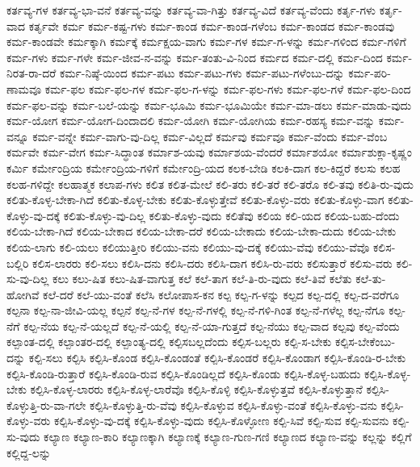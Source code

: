 {ಕರ್ತವ್ಯ-ಗಳ
ಕರ್ತವ್ಯ-ಭಾ-ವನೆ
ಕರ್ತವ್ಯ-ವನ್ನು
ಕರ್ತವ್ಯ-ವಾ-ಗಿತ್ತು
ಕರ್ತವ್ಯ-ವಿದೆ
ಕರ್ತವ್ಯ-ವೆಂದು
ಕರ್ತೃ-ಗಳು
ಕರ್ತೃ-ವಾದ
ಕರ್ತೃವೇ
ಕರ್ಮ
ಕರ್ಮ-ಕಷ್ಟ-ಗಳು
ಕರ್ಮ-ಕಾಂಡ
ಕರ್ಮ-ಕಾಂಡ-ಗಳೆಂಬ
ಕರ್ಮ-ಕಾಂಡದ
ಕರ್ಮ-ಕಾಂಡವು
ಕರ್ಮ-ಕಾಂಡವೇ
ಕರ್ಮಕ್ಕಾಗಿ
ಕರ್ಮಕ್ಕೆ
ಕರ್ಮಕ್ಷಯ-ವಾಗು
ಕರ್ಮ-ಗಳ
ಕರ್ಮ-ಗ-ಳನ್ನು
ಕರ್ಮ-ಗಳಿಂದ
ಕರ್ಮ-ಗಳಿಗೆ
ಕರ್ಮ-ಗಳು
ಕರ್ಮ-ಗಳೇ
ಕರ್ಮ-ಜೀವ-ನ-ವನ್ನು
ಕರ್ಮ-ತಂತು-ವಿ-ನಿಂದ
ಕರ್ಮದ
ಕರ್ಮ-ದಲ್ಲಿ
ಕರ್ಮ-ದಿಂದ
ಕರ್ಮ-ನಿರತ-ರಾ-ದರೆ
ಕರ್ಮ-ನಿಷ್ಠೆ-ಯಿಂದ
ಕರ್ಮ-ಪಟು
ಕರ್ಮ-ಪಟು-ಗಳು
ಕರ್ಮ-ಪಟು-ಗಳೆಂಬು-ದನ್ನು
ಕರ್ಮ-ಪರಿ-ಣಾಮವೂ
ಕರ್ಮ-ಫಲ
ಕರ್ಮ-ಫಲ-ಗಳ
ಕರ್ಮ-ಫಲ-ಗ-ಳನ್ನು
ಕರ್ಮ-ಫಲ-ಗಳು
ಕರ್ಮ-ಫಲ-ಗಳೆ
ಕರ್ಮ-ಫಲ-ದಿಂದ
ಕರ್ಮ-ಫಲ-ವನ್ನು
ಕರ್ಮ-ಬಲೆ-ಯನ್ನು
ಕರ್ಮ-ಭೂಮಿ
ಕರ್ಮ-ಭೂಮಿಯೇ
ಕರ್ಮ-ಮಾ-ಡಲು
ಕರ್ಮ-ಮಾಡು-ವುದು
ಕರ್ಮ-ಯೋಗ
ಕರ್ಮ-ಯೋಗ-ದಿಂದಾದಲಿ
ಕರ್ಮ-ಯೋಗಿ
ಕರ್ಮ-ಯೋಗಿಯ
ಕರ್ಮ-ರಹಸ್ಯ
ಕರ್ಮ-ವನ್ನು
ಕರ್ಮ-ವನ್ನೂ
ಕರ್ಮ-ವನ್ನೇ
ಕರ್ಮ-ವಾಗು-ವು-ದಿಲ್ಲ
ಕರ್ಮ-ವಿಲ್ಲದೆ
ಕರ್ಮವು
ಕರ್ಮವೂ
ಕರ್ಮ-ವೆಂದು
ಕರ್ಮ-ವೆಂಬ
ಕರ್ಮವೇ
ಕರ್ಮ-ವೇಗ
ಕರ್ಮ-ಸಿದ್ಧಾಂತ
ಕರ್ಮಾಶ-ಯವು
ಕರ್ಮಾಶಯ-ವೆಂದರೆ
ಕರ್ಮಾಶಯೋ
ಕರ್ಮಾಶುಕ್ಲಾ-ಕೃಷ್ಣಂ
ಕರ್ಮಿ
ಕರ್ಮೇಂದ್ರಿಯ
ಕರ್ಮೇಂದ್ರಿಯ-ಗಳಿಗೆ
ಕರ್ಮೇಂದ್ರಿ-ಯದ
ಕಲಕ-ಬೇಡಿ
ಕಲಕಿ-ದಾಗ
ಕಲ-ಕಿದ್ದರೆ
ಕಲಸು
ಕಲಹ
ಕಲಹ-ಗಳಿದ್ದೇ
ಕಲಹಾತ್ಮಕ
ಕಲಾಪ-ಗಳು
ಕಲಿತ
ಕಲಿತ-ಮೇಲೆ
ಕಲಿ-ತರು
ಕಲಿ-ತರೆ
ಕಲಿ-ತರೊ
ಕಲಿ-ತವು
ಕಲಿತಿ-ರು-ವುದು
ಕಲಿತು-ಕೊಳ್ಳ-ಬೇಕಾ-ಗಿದೆ
ಕಲಿತು-ಕೊಳ್ಳ-ಬೇಕು
ಕಲಿತು-ಕೊಳ್ಳುತ್ತೇವೆ
ಕಲಿತು-ಕೊಳ್ಳು-ವರು
ಕಲಿತು-ಕೊಳ್ಳು-ವಾಗ
ಕಲಿತು-ಕೊಳ್ಳು-ವು-ದಕ್ಕೆ
ಕಲಿತು-ಕೊಳ್ಳು-ವು-ದಿಲ್ಲ
ಕಲಿತು-ಕೊಳ್ಳು-ವುದು
ಕಲಿತೆವು
ಕಲಿಯ
ಕಲಿ-ಯದ
ಕಲಿಯ-ಬಹು-ದೆಂದು
ಕಲಿಯ-ಬೇಕಾ-ಗಿದೆ
ಕಲಿಯ-ಬೇಕಾದ
ಕಲಿಯ-ಬೇಕಾ-ದರೆ
ಕಲಿಯ-ಬೇಕಾದು
ಕಲಿಯ-ಬೇಕಾ-ದುದು
ಕಲಿಯ-ಬೇಕು
ಕಲಿಯ-ಲಾಗು
ಕಲಿ-ಯಲು
ಕಲಿಯುತ್ತೀರಿ
ಕಲಿಯು-ವನು
ಕಲಿಯು-ವು-ದಕ್ಕೆ
ಕಲಿಯು-ವೆವು
ಕಲಿಯು-ವೆವೊ
ಕಲಿಸ-ಬಲ್ಲಿರಿ
ಕಲಿಸ-ಲಾರರು
ಕಲಿ-ಸಲು
ಕಲಿಸಿ-ದನು
ಕಲಿಸಿ-ದರು
ಕಲಿಸಿ-ದಾಗ
ಕಲಿಸಿ-ರು-ವರು
ಕಲಿಸುತ್ತಾರೆ
ಕಲಿಸು-ವರು
ಕಲಿ-ಸು-ವು-ದಿಲ್ಲ
ಕಲು
ಕಲು-ಷಿತ
ಕಲು-ಷಿತ-ವಾಗುತ್ತ
ಕಲೆ
ಕಲೆ-ತಾಗ
ಕಲೆ-ತಿ-ರು-ವುದು
ಕಲೆ-ತಿವೆ
ಕಲೆತು
ಕಲೆ-ತು-ಹೋಗಿವೆ
ಕಲೆ-ದರೆ
ಕಲೆ-ಯು-ವಂತೆ
ಕಲೆಸಿ
ಕಲೋಪಾಸ-ಕನ
ಕಲ್ಪ
ಕಲ್ಪ-ಗ-ಳನ್ನು
ಕಲ್ಪದ
ಕಲ್ಪ-ದಲ್ಲಿ
ಕಲ್ಪ-ದ-ವರೆಗೂ
ಕಲ್ಪನಾ
ಕಲ್ಪ-ನಾ-ಜೀವಿ-ಯಲ್ಲ
ಕಲ್ಪನೆ
ಕಲ್ಪ-ನೆ-ಗಳ
ಕಲ್ಪ-ನೆ-ಗಳಲ್ಲಿ
ಕಲ್ಪ-ನೆ-ಗಳಿ-ಗಿಂತ
ಕಲ್ಪ-ನೆ-ಗಳೆಲ್ಲ
ಕಲ್ಪ-ನೆಗೂ
ಕಲ್ಪ-ನೆಗೆ
ಕಲ್ಪ-ನೆಯ
ಕಲ್ಪ-ನೆ-ಯಲ್ಲದೆ
ಕಲ್ಪ-ನೆ-ಯಲ್ಲಿ
ಕಲ್ಪ-ನೆ-ಯಾ-ಗುತ್ತದೆ
ಕಲ್ಪ-ನೆಯು
ಕಲ್ಪ-ವಾದ
ಕಲ್ಪವು
ಕಲ್ಪ-ವೆಂದು
ಕಲ್ಪಾಂತ-ದಲ್ಲಿ
ಕಲ್ಪಾಂತರ-ದಲ್ಲಿ
ಕಲ್ಪಾಂತ್ಯ-ದಲ್ಲಿ
ಕಲ್ಪಿಸಬಲ್ಲದೆಂದು
ಕಲ್ಪಿಸ-ಬಲ್ಲರು
ಕಲ್ಪಿ-ಸ-ಬೇಕು
ಕಲ್ಪಿಸ-ಬೇಕೆಂಬು-ದನ್ನು
ಕಲ್ಪಿ-ಸಲು
ಕಲ್ಪಿಸಿ
ಕಲ್ಪಿಸಿ-ಕೊಂಡ
ಕಲ್ಪಿಸಿ-ಕೊಂಡಂತೆ
ಕಲ್ಪಿಸಿ-ಕೊಂಡರೆ
ಕಲ್ಪಿಸಿ-ಕೊಂಡಾಗ
ಕಲ್ಪಿಸಿ-ಕೊಂಡಿ-ರ-ಬೇಕು
ಕಲ್ಪಿಸಿ-ಕೊಂಡಿ-ರುತ್ತಾರೆ
ಕಲ್ಪಿಸಿ-ಕೊಂಡಿ-ರುವ
ಕಲ್ಪಿಸಿ-ಕೊಂಡಿಲ್ಲದೆ
ಕಲ್ಪಿಸಿ-ಕೊಂಡು
ಕಲ್ಪಿಸಿ-ಕೊಳ್ಳ-ಬಹುದು
ಕಲ್ಪಿಸಿ-ಕೊಳ್ಳ-ಬೇಕು
ಕಲ್ಪಿಸಿ-ಕೊಳ್ಳ-ಲಾರರು
ಕಲ್ಪಿಸಿ-ಕೊಳ್ಳ-ಲಾರೆವೊ
ಕಲ್ಪಿಸಿ-ಕೊಳ್ಳಿ
ಕಲ್ಪಿಸಿ-ಕೊಳ್ಳುತ್ತವೆ
ಕಲ್ಪಿಸಿ-ಕೊಳ್ಳುತ್ತಾನೆ
ಕಲ್ಪಿಸಿ-ಕೊಳ್ಳುತ್ತಿ-ರು-ವಾ-ಗಲೇ
ಕಲ್ಪಿಸಿ-ಕೊಳ್ಳುತ್ತಿ-ರು-ವೆವು
ಕಲ್ಪಿಸಿ-ಕೊಳ್ಳುವ
ಕಲ್ಪಿಸಿ-ಕೊಳ್ಳು-ವಂತೆ
ಕಲ್ಪಿಸಿ-ಕೊಳ್ಳು-ವನು
ಕಲ್ಪಿಸಿ-ಕೊಳ್ಳು-ವರು
ಕಲ್ಪಿಸಿ-ಕೊಳ್ಳು-ವು-ದಕ್ಕೆ
ಕಲ್ಪಿಸಿ-ಕೊಳ್ಳು-ವುದು
ಕಲ್ಪಿಸಿ-ಕೊಳ್ಳೋಣ
ಕಲ್ಪಿ-ಸಿವೆ
ಕಲ್ಪಿ-ಸುವ
ಕಲ್ಪಿ-ಸುವನು
ಕಲ್ಪಿ-ಸು-ವುದು
ಕಲ್ಯಾಣ
ಕಲ್ಯಾಣ-ಕಾರಿ
ಕಲ್ಯಾಣಕ್ಕಾಗಿ
ಕಲ್ಯಾಣಕ್ಕೆ
ಕಲ್ಯಾಣ-ಗುಣ-ಗಣಿ
ಕಲ್ಯಾಣದ
ಕಲ್ಯಾಣ-ವನ್ನು
ಕಲ್ಲನ್ನು
ಕಲ್ಲಿಗೆ
ಕಲ್ಲಿದ್ದ-ಲನ್ನು
}
